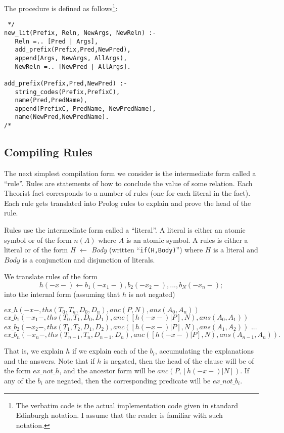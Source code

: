 The procedure is defined as follows\footnote{The verbatim code
is the actual implementation code given in standard Edinburgh notation.
I assume that the reader is familiar with such notation.}:
\begin{verbatim} */
new_lit(Prefix, Reln, NewArgs, NewReln) :-
   Reln =.. [Pred | Args],
   add_prefix(Prefix,Pred,NewPred),
   append(Args, NewArgs, AllArgs),
   NewReln =.. [NewPred | AllArgs].

add_prefix(Prefix,Pred,NewPred) :-
   string_codes(Prefix,PrefixC),
   name(Pred,PredName),
   append(PrefixC, PredName, NewPredName),
   name(NewPred,NewPredName).
/* \end{verbatim}
\subsection{Compiling Rules}
The next simplest compilation form we consider is the intermediate form
called a ``rule''.
Rules are statements of how to conclude
the value of some relation. Each Theorist fact corresponds to a number
of rules (one for each literal in the fact).
Each rule gets translated into Prolog rules to explain
and prove the head of the rule. 

Rules use the intermediate form called a ``literal''.
A literal is either an atomic symbol or of the form $n(A)$ where $A$ is
an atomic symbol.
A rules is either a literal or
of the form {\em H $\leftarrow$ Body} (written ``{\tt if(H,Body)}'')
where $H$ is a literal
and $Body$ is a conjunction and disjunction of literals.

We translate rules of the form
\[h(-x-) \leftarrow b_1(-x_1-), b_2(-x_2-), ... ,b_N(-x_n-);\]
into the internal form (assuming that $h$ is not negated)
\begin{prolog}
$ex\_h(-x-,ths(T_0,T_n,D_0,D_n), anc(P,N), ans(A_0,A_n)) $\IF
$ex\_b_1(-x_1-,ths(T_0,T_1,D_0,D_1), anc([h(-x-)|P],N), ans(A_0,A_1))$\AND
$ex\_b_2(-x_2-,ths(T_1,T_2,D_1,D_2), anc([h(-x-)|P],N), ans(A_1,A_2))$\AND
$...$\AND
$ex\_b_n(-x_n-,ths(T_{n-1},T_n,D_{n-1},D_n), anc([h(-x-)|P],N),
ans(A_{n-1},A_n)).$
\end{prolog}
That is, we explain $h$ if we explain each of the $b_i$,
accumulating the explanations and the answers.
Note that if $h$ is negated, then the head of the clause will be of
the form $ex\_not\_h$, and the ancestor form will be
$anc(P,[h(-x-)|N])$. If any of the $b_i$ are negated, then the
corresponding predicate will be $ex\_not\_b_i$.

